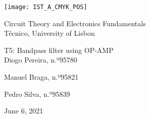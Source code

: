 
\thispagestyle {empty}

\texttt{[image: IST\_A\_CMYK\_POS]}

\begin{center}
%
\vspace{1.0cm}

\vspace{1cm}
{\FontLb Circuit Theory and Electronics Fundamentals} \\ %
\vspace{1cm}
{\FontSn Técnico, University of Lisbon} \\ %
\vspace{1cm}

{\FontSn T5: Bandpass filter using OP-AMP} \\
\vspace{1cm}
{\FontSn Diogo Pereira, n.º95780}
\par{\FontSn Manuel Braga, n.º95821}
\par{\FontSn Pedro Silva, n.º95839}
\vspace{1.0cm}
\par{\FontSn June 6, 2021} \\ %
%
\end{center}

